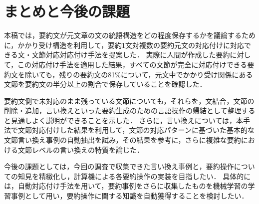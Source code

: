 \section{まとめと今後の課題}

本稿では，要約文が元文章の文の統語構造をどの程度保存するかを議論するために，かかり受け構造を利用して，要約1文対複数の要約元文の対応付けに対応できる文・文節対応対応付け手法を提案した．
実際に人間が作成した要約に対して，この対応付け手法を適用した結果，すべての文節が完全に対応付けできる要約文を除いても，残りの要約文の81\%について，元文中でかかり受け関係にある文節を要約文の半分以上の割合で保存していることを確認した．

要約文側で未対応のまま残っている文節についても，それらを，文結合，文節の削除・追加，言い換えといった要約生成のための言語操作の帰結として整理すると見通しよく説明ができることを示した．
さらに，言い換えについては，本手法で文節対応付けした結果を利用して，文節の対応パターンに基づいた基本的な文節言い換え事例の自動抽出を試み，その結果を参考に，さらに複雑な要約における文節レベルの言い換えの特質を論じた．

今後の課題としては，今回の調査で収集できた言い換え事例と，要約操作についての知見を精緻化し，計算機による各要約操作の実装を目指したい．
具体的には，自動対応付け手法を用いて，要約事例をさらに収集したものを機械学習の学習事例として用い，要約操作に関する知識を自動獲得することを検討したい．




\begin{biography}


\end{biography}


